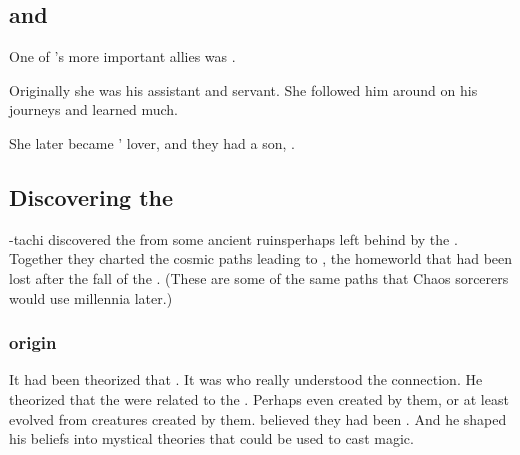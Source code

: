 \subsection[Sethicus and Tyrasshana]{\Sethicus and \Tiamat}
One of \Sethicus's more important allies was . 

Originally she was his assistant and servant.
She followed him around on his journeys and learned much. 

She later became \Sethicus' lover, and they had a son, \Nexagglachel. 









\subsection{Discovering the \xss}
\Sethicus-tachi discovered the \xss{} from some ancient ruins\dash perhaps left behind by the \voyagers. 
Together they charted the cosmic paths leading to \Machai, the \xzaishannic{} homeworld that had been lost after the fall of the \ophidians. 
(These are some of the same paths that Chaos sorcerers would use millennia later.)





\subsubsection{\Ophidian origin}
It had been theorized that . 
It was \Sethicus who really understood the connection. 
He theorized that the \ophidians were related to the \xss.
Perhaps even created by them, or at least evolved from creatures created by them.
\Sethicus believed they had been . 
And he shaped his beliefs into mystical theories that could be used to cast magic. 


